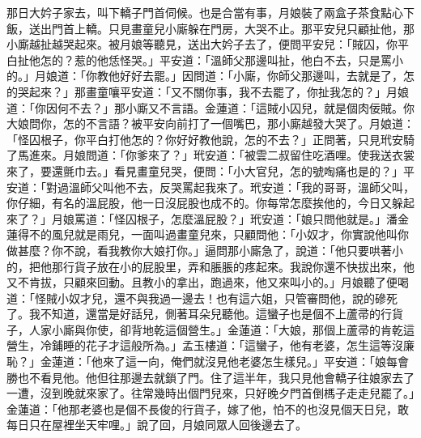 那日大妗子家去，叫下轎子門首伺候。也是合當有事，月娘裝了兩盒子茶食點心下飯，送出門首上轎。只見畫童兒小廝躲在門房，大哭不止。那平安兒只顧扯他，那小廝越扯越哭起來。被月娘等聽見，送出大妗子去了，便問平安兒：「賊囚，你平白扯他怎的？惹的他恁怪哭。」平安道：「溫師父那邊叫扯，他白不去，只是罵小的。」月娘道：「你教他好好去罷。」因問道：「小廝，你師父那邊叫，去就是了，怎的哭起來？」那畫童嚷平安道：「又不關你事，我不去罷了，你扯我怎的？」月娘道：「你因何不去？」那小廝又不言語。金蓮道：「這賊小囚兒，就是個肉佞賊。你大娘問你，怎的不言語？被平安向前打了一個嘴巴，那小廝越發大哭了。月娘道：「怪囚根子，你平白打他怎的？你好好教他說，怎的不去？」正問著，只見玳安騎了馬進來。月娘問道：「你爹來了？」玳安道：「被雲二叔留住吃酒哩。使我送衣裳來了，要還氈巾去。」看見畫童兒哭，便問：「小大官兒，怎的號啕痛也是的？」平安道：「對過溫師父叫他不去，反哭罵起我來了。玳安道：「我的哥哥，溫師父叫，你仔細，有名的溫屁股，他一日沒屁股也成不的。你每常怎麼挨他的，今日又躲起來了？」月娘罵道：「怪囚根子，怎麼溫屁股？」玳安道：「娘只問他就是。」潘金蓮得不的風兒就是雨兒，一面叫過畫童兒來，只顧問他：「小奴才，你實說他叫你做甚麼？你不說，看我教你大娘打你。」逼問那小廝急了，說道：「他只要哄著小的，把他那行貨子放在小的屁股里，弄和脹脹的疼起來。我說你還不快拔出來，他又不肯拔，只顧來回動。且教小的拿出，跑過來，他又來叫小的。」月娘聽了便喝道：「怪賊小奴才兒，還不與我過一邊去！也有這六姐，只管審問他，說的磣死了。我不知道，還當是好話兒，側著耳朵兒聽他。這蠻子也是個不上蘆帚的行貨子，人家小廝與你使，卻背地乾這個營生。」金蓮道：「大娘，那個上蘆帚的肯乾這營生，冷鋪睡的花子才這般所為。」孟玉樓道：「這蠻子，他有老婆，怎生這等沒廉恥？」金蓮道：「他來了這一向，俺們就沒見他老婆怎生樣兒。」平安道：「娘每會勝也不看見他。他但往那邊去就鎖了門。住了這半年，我只見他會轎子往娘家去了一遭，沒到晚就來家了。往常幾時出個門兒來，只好晚夕門首倒榪子走走兒罷了。」金蓮道：「他那老婆也是個不長俊的行貨子，嫁了他，怕不的也沒見個天日兒，敢每日只在屋裡坐天牢哩。」說了回，月娘同眾人回後邊去了。

